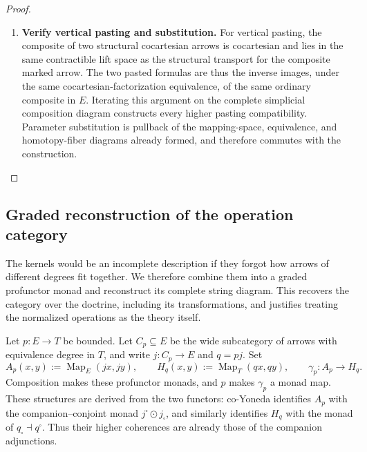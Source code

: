 \documentclass[oneside]{article}
\theoremstyle{plain}
\theoremstyle{definition}
\theoremstyle{remark}
\newcommand{\Map}{\operatorname{Map}}
\begin{document}
\begin{proof}
\begin{enumerate}
$\Lambda_{a,x}$ is an equivalence of complete mapping-space families, its
inverse transports this identification, together with every higher simplex,
back to the displayed operation family. The resulting comparison is
balanced in the intermediate fiber variable and therefore descends to
the coend defining the composite profunctor.
\item \textbf{Verify vertical pasting and substitution.} For vertical pasting, the composite of two structural cocartesian arrows is
cocartesian and lies in the same contractible lift space as the structural
transport for the composite marked arrow.  The two pasted formulas are thus
the inverse images, under the same cocartesian-factorization equivalence, of
the same ordinary composite in $E$.  Iterating this argument on the complete
simplicial composition diagram constructs every higher pasting compatibility.
Parameter substitution is pullback of the mapping-space, equivalence, and
homotopy-fiber diagrams already formed, and therefore commutes with the
construction.\qedhere
\end{enumerate}
\end{proof}


\subsection{Graded reconstruction of the operation category}\label{sec:graded-reconstruction}

The kernels would be an incomplete description if they forgot how arrows
of different degrees fit together. We therefore combine them into a
graded profunctor monad and reconstruct its complete string diagram. This
recovers the category over the doctrine, including its transformations,
and justifies treating the normalized operations as the theory itself.

Let $p:E\to T$ be bounded.  Let $C_p\subseteq E$ be the wide subcategory
of arrows with equivalence degree in $T$, and write $j:C_p\to E$ and
$q=pj$.  Set
\begin{equation}\label{thz:eq:aggregate}A_p(x,y):=\Map_E(jx,jy),\qquad
 H_q(x,y):=\Map_T(qx,qy),\qquad
 \gamma_p:A_p\longrightarrow H_q.
\end{equation}
Composition makes these profunctor monads, and $p$ makes $\gamma_p$ a monad
map.  These structures are derived from the two functors: co-Yoneda
identifies $A_p$ with the companion--conjoint monad
$j^\square\odot j_\square$, and similarly identifies $H_q$ with the monad
of $q_\square\dashv q^\square$.  Thus their higher coherences are already
those of the companion adjunctions.
\end{document}
